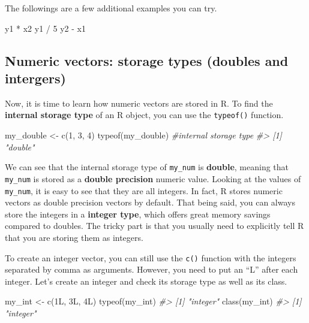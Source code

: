 \documentclass[
]{book}
\newenvironment{Shaded}{\begin{snugshade}}{\end{snugshade}}
\newcommand{\CommentTok}[1]{\textcolor[rgb]{0.56,0.35,0.01}{\textit{#1}}}
\newcommand{\DecValTok}[1]{\textcolor[rgb]{0.00,0.00,0.81}{#1}}
\newcommand{\FunctionTok}[1]{\textcolor[rgb]{0.00,0.00,0.00}{#1}}
\newcommand{\NormalTok}[1]{#1}
\newcommand{\OtherTok}[1]{\textcolor[rgb]{0.56,0.35,0.01}{#1}}
\newcommand{\SpecialCharTok}[1]{\textcolor[rgb]{0.00,0.00,0.00}{#1}}
\begin{document}
The followings are a few additional examples you can try.

\begin{Shaded}
\begin{Highlighting}[]
\NormalTok{y1 }\SpecialCharTok{*}\NormalTok{ x2}
\NormalTok{y1 }\SpecialCharTok{/} \DecValTok{5}
\NormalTok{y2 }\SpecialCharTok{{-}}\NormalTok{ x1}
\end{Highlighting}
\end{Shaded}

\hypertarget{storage-type}{%
\subsection{Numeric vectors: storage types (doubles and intergers)}\label{storage-type}}

Now, it is time to learn how numeric vectors are stored in R. To find the \textbf{internal storage type} of an R object, you can use the \texttt{typeof()} function.

\begin{Shaded}
\begin{Highlighting}[]
\NormalTok{my\_double }\OtherTok{\textless{}{-}} \FunctionTok{c}\NormalTok{(}\DecValTok{1}\NormalTok{, }\DecValTok{3}\NormalTok{, }\DecValTok{4}\NormalTok{)}
\FunctionTok{typeof}\NormalTok{(my\_double)         }\CommentTok{\#internal storage type}
\CommentTok{\#\textgreater{} [1] "double"}
\end{Highlighting}
\end{Shaded}

We can see that the internal storage type of \texttt{my\_num} is \textbf{double}, meaning that \texttt{my\_num} is stored as a \textbf{double precision} numeric value. Looking at the values of \texttt{my\_num}, it is easy to see that they are all integers. In fact, R stores numeric vectors as double precision vectors by default. That being said, you can always store the integers in a \textbf{integer type}, which offers great memory savings compared to doubles. The tricky part is that you usually need to explicitly tell R that you are storing them as integers.

To create an integer vector, you can still use the \texttt{c()} function with the integers separated by comma as arguments. However, you need to put an ``L'' after each integer. Let's create an integer and check its storage type as well as its class.

\begin{Shaded}
\begin{Highlighting}[]
\NormalTok{my\_int }\OtherTok{\textless{}{-}} \FunctionTok{c}\NormalTok{(1L, 3L, 4L)}
\FunctionTok{typeof}\NormalTok{(my\_int)}
\CommentTok{\#\textgreater{} [1] "integer"}
\FunctionTok{class}\NormalTok{(my\_int)}
\CommentTok{\#\textgreater{} [1] "integer"}
\end{Highlighting}
\end{Shaded}
\end{document}
